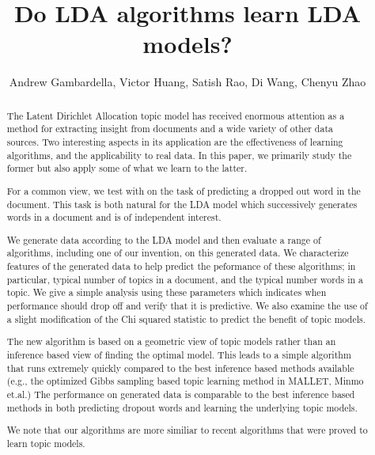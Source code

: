 \documentclass{article}
\title{Do LDA algorithms learn LDA models? }
\author{Andrew Gambardella, Victor Huang, Satish Rao, Di Wang, Chenyu Zhao}
\date{}
\begin{document}
\maketitle

\begin{abstract}
The Latent Dirichlet Allocation topic model has received enormous
attention as a method for extracting insight from documents and a wide
variety of other data sources.  Two interesting aspects in its application
are the effectiveness of learning algorithms, and the applicability to real
data.  In this paper, we primarily study the former but also apply some
of what we learn to the latter.

For a common view, we test with on the task of predicting a dropped
out word in the document.  This task is both natural for the LDA model
which successively generates words in a document and is of independent
interest. 


We generate data according to the LDA model and then evaluate a range
of algorithms, including one of our invention, on this generated data.
We characterize features of the generated data to help predict the
peformance of these algorithms; in particular, typical number of
topics in a document, and the typical number words in a topic.  We
give a simple analysis using these parameters which indicates 
when performance should drop off and verify that it is predictive.
We also examine the use of a slight modification of the Chi squared
statistic to predict the benefit of topic models. 

The new algorithm is based on a geometric view of topic models rather
than an inference based view of finding the optimal model.  This leads
to a simple algorithm that runs extremely quickly compared to the best
inference based methods available (e.g., the optimized Gibbs sampling
based topic learning method in MALLET, Minmo et.al.)  The performance
on generated data is comparable to the best inference based methods in
both predicting dropout words and learning the underlying topic models.

We note that our algorithms are more similiar to recent algorithms
that were proved to learn topic models.  




\end{abstract}
\end{document}
